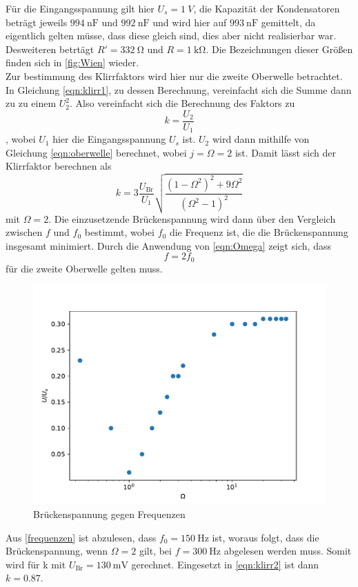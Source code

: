 Für die Eingangsspannung gilt hier $U_s=\qty{1}{V}$, die Kapazität der Kondensatoren beträgt jeweils $\qty{994}{\nano\farad}
\text{ und } \qty{992}{\nano\farad}$ und wird hier auf $\qty{993}{\nano\farad}$ gemittelt, da eigentlich gelten müsse, dass 
diese gleich sind, dies aber nicht realisierbar war. Desweiteren betrtägt $R'=\qty{332}{\ohm} \text{ und } R=\qty{1}{\kilo\ohm}$.
Die Bezeichnungen dieser Größen finden sich in \ref{fig:Wien} wieder.\\
Zur bestimmung des Klirrfaktors wird hier nur die zweite Oberwelle betrachtet. In Gleichung \ref{eqn:klirr1}, zu dessen Berechnung, vereinfacht
sich die Summe dann zu zu einem $U_2^2$. Also vereinfacht sich die Berechnung des Faktors zu 
\begin{equation}
    k=\frac{U_2}{U_1}
\end{equation}
, wobei $U_1$ hier die Eingangsspannung $U_s$ ist. $U_2$ wird dann mithilfe von Gleichung \ref{eqn:oberwelle} berechnet, wobei $j=\Omega=2$ ist.
Damit lässt sich der Klirrfaktor berechnen als
\begin{equation}
    k=3 \frac{U_\text{Br}}{U_1} \sqrt{\frac{(1-\Omega^2)^2+9\Omega^2}{(\Omega^2-1)^2}}
    \label{eqn:klirr2}
\end{equation}
mit $\Omega=2$. Die einzusetzende Brückenspannung wird dann über den Vergleich zwischen $ f $ und $f_0$ bestimmt, wobei $f_0$
die Frequenz ist, die die Brückenspannung insgesamt minimiert. Durch die Anwendung von \ref{eqn:Omega} zeigt sich, dass 
\begin{equation}
    f=2f_0
\end{equation}
für die zweite Oberwelle gelten muss. 

\begin{figure}
    \centering
    \includegraphics{ ./frequenzplot.pdf}
    \caption{Brückenspannung gegen Frequenzen}
    \label{fig:frequenzverhältnis}
\end{figure}

Aus \ref{frequenzen} ist abzulesen, dass $f_0=\qty{150}{\hertz}$ ist, woraus folgt,
dass die Brückenspannung, wenn $\Omega=2$ gilt, bei $f=\qty{300}{\hertz}$ abgelesen werden muss. Somit wird für k mit
$U_\text{Br}=\qty{130}{\milli\volt}$ gerechnet. Eingesetzt in \ref{eqn:klirr2} ist dann $k=0.87$.
